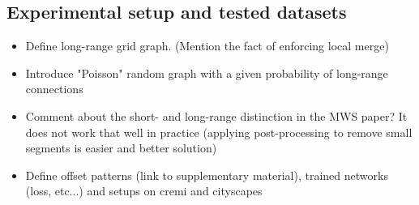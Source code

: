 
\subsection{Experimental setup and tested datasets}
\begin{itemize}
    \item Define long-range grid graph. (Mention the fact of enforcing local merge)
\item Introduce "Poisson" random graph with a given probability of long-range connections
\item Comment about the short- and long-range distinction in the MWS paper? It does not work that well in practice (applying post-processing to remove small segments is easier and better solution)
\item Define offset patterns (link to supplementary material), trained networks (loss, etc...) and setups on cremi and cityscapes 
\end{itemize}
